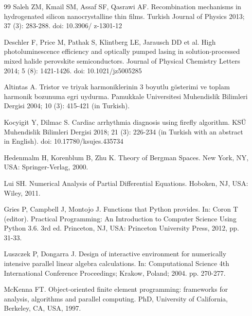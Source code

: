 \documentclass{fizik}
\begin{document}
\begin{thebibliography}{99}
 Saleh ZM, Kmail SM, Assaf SF, Qasrawi AF. Recombination mechanisms in hydrogenated silicon nanocrystalline thin films. Turkish Journal of Physics 2013; 37 (3): 283-288. doi: 10.3906/ z-1301-12

 Deschler F, Price M, Pathak S, Klintberg LE, Jarausch DD et al. High photoluminescence efficiency and optically pumped lasing in solution-processed mixed halide perovskite semiconductors. Journal of Physical Chemistry Letters 2014; 5 (8): 1421-1426. doi: 10.1021/jz5005285

 Altintas A. Tristor ve triyak harmoniklerinin 3 boyutlu gösterimi ve toplam harmonik bozunuma egri uydurma. Pamukkale Universitesi Muhendislik Bilimleri Dergisi 2004; 10 (3): 415-421 (in Turkish).

 Kocyigit Y, Dilmac S. Cardiac arrhythmia diagnosis using firefly algorithm. KSÜ Muhendislik Bilimleri Dergisi 2018; 21 
(3): 226-234 (in Turkish with an abstract in English). doi: 10.17780/ksujes.435734

 Hedenmalm H, Korenblum B, Zhu K. Theory of Bergman Spaces. New York, NY, USA: Springer-Verlag, 2000.

 Lui SH. Numerical Analysis of Partial Differential Equations. Hoboken, NJ, USA: Wiley, 2011.

 Gries P, Campbell J, Montojo J. Functions that Python provides. In: Coron T (editor). Practical Programming: An Introduction to Computer Science Using Python 3.6. 3rd ed. Princeton, NJ, USA: Princeton University Press, 2012, pp. 31-33.

 Luszczek P, Dongarra J. Design of interactive environment for numerically intensive parallel linear algebra calculations. In: Computational Science  4th International Conference Proceedings; Krakow, Poland; 2004. pp. 270-277.

 McKenna FT. Object-oriented finite element programming: frameworks for analysis, algorithms and parallel computing. PhD, University of California, Berkeley, CA, USA, 1997.
\end{thebibliography}
\end{document}
